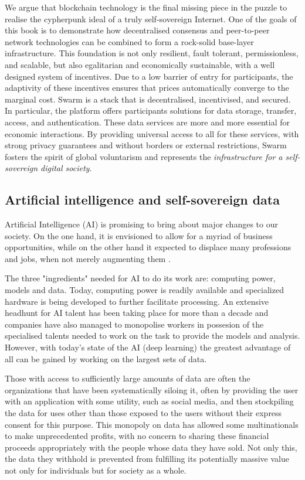 We argue that blockchain technology is the final missing piece in the puzzle to realise the cypherpunk ideal of a truly self-sovereign Internet. One of the goals of this book is to demonstrate how decentralised consensus and peer-to-peer network technologies can be combined to form a rock-solid base-layer infrastructure. This foundation is not only resilient, fault tolerant, permissionless, and scalable, but also egalitarian and economically sustainable, with a well designed system of incentives. Due to a low barrier of entry for participants, the adaptivity of these incentives ensures that prices automatically converge to the marginal cost.
Swarm is a  stack that is decentralised, incentivised, and secured. In particular, the platform offers participants solutions for data storage, transfer, access, and authentication. These data services are more and more essential for economic interactions. By providing universal access to all for these services, with strong privacy guarantees and without borders or external restrictions, Swarm fosters the spirit of global voluntarism and represents the \emph{infrastructure for a self-sovereign digital society}.

\subsection{Artificial intelligence and self-sovereign data \statusgreen} \label{sec:AIdata}

Artificial Intelligence (AI) is promising to bring about major changes to our society. On the one hand, it is envisioned to allow for a myriad of business opportunities, while on the other hand it expected to displace many professions and jobs, when not merely augmenting them \cite{Lee2018Sep}.

The three "ingredients" needed for AI to do its work are: computing power, models and data. Today, computing power is readily available and specialized hardware is being developed to further facilitate processing. An extensive headhunt for AI talent has been taking place for more than a decade and companies have also managed to monopolise workers in possesion of the specialised talents needed to work on the task to provide the models and analysis. However, with today's state of the AI (deep learning) the greatest advantage of all can be gained by working on the largest sets of data.

Those with access to sufficiently large amounts of data are often the organizations that have been systematically siloing it, often by providing the user with an application with some utility, such as social media, and then stockpiling the data for uses other than those exposed to the users without their express consent for this purpose. This monopoly on data has allowed some multinationals to make unprecedented profits, with no concern to sharing these financial proceeds appropriately with the people whose data they have sold. Not only this, the data they withhold is prevented from fulfilling its potentially massive value not only for individuals but for society as a whole.

